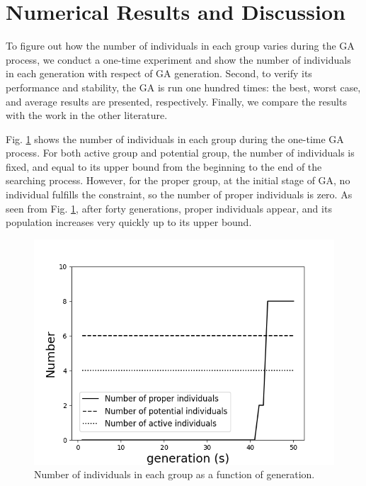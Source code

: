 \section{Numerical Results and Discussion}
To figure out how the number of individuals in each group varies during the GA
process, we conduct a one-time experiment and show the number of individuals
in each generation with respect of GA generation. Second, to verify its
performance and stability, the GA is run one hundred times: the best, worst
case, and average results are presented, respectively. Finally, we compare
the results with the work in the other literature.


Fig. \ref{fig:group} shows the number of individuals in each group during the
one-time GA process.  For both active group and potential group, the number of
individuals is fixed, and equal to its upper bound from the beginning to the
end of the searching process. However, for the proper group, at the initial
stage of GA, no individual fulfills the constraint, so the number of proper
individuals is zero. As seen from Fig. \ref{fig:group}, after forty
generations, proper individuals appear, and its population increases very
quickly up to its upper bound.

\begin{figure}[!b]
	\centering
	\includegraphics[width=\linewidth]{fig/group_number.png}
	\caption{Number of individuals in each group as a function of generation.}
	\label{fig:group}
\end{figure}

